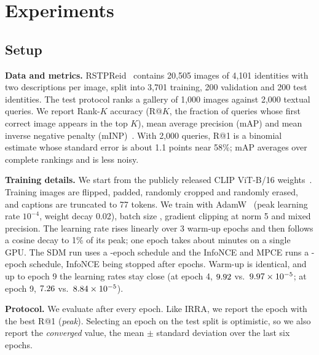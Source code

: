 \section{Experiments \tagO}\label{sec:experiments}

\subsection{Setup}\label{sec:setup}

\textbf{Data and metrics.} RSTPReid~\cite{Zhu_2021} contains 20,505 images of 4,101 identities with two descriptions per image, split into 3,701 training, 200 validation and 200 test identities. The test protocol ranks a gallery of 1,000 images against 2,000 textual queries. We report Rank-$K$ accuracy (R@$K$, the fraction of queries whose first correct image appears in the top $K$), mean average precision (mAP) and mean inverse negative penalty (mINP)~\cite{jiang2023crossmodalimplicitrelationreasoning}. With 2,000 queries, R@1 is a binomial estimate whose standard error is about 1.1 points near 58\%; mAP averages over complete rankings and is less noisy.

\textbf{Training details.} We start from the publicly released CLIP ViT-B/16 weights~\cite{radford2021learningtransferablevisualmodels}. Training images are flipped, padded, randomly cropped and randomly erased, and captions are truncated to 77 tokens. We train with AdamW~\cite{loshchilov2019decoupledweightdecayregularization} (peak learning rate $10^{-4}$, weight decay 0.02), batch size \batchSize, gradient clipping at norm 5 and mixed precision. The learning rate rises linearly over 3 warm-up epochs and then follows a cosine decay to 1\% of its peak; one epoch takes about \sdmMinPerEp{} minutes on a single GPU. The SDM run uses a \sdmRounds-epoch schedule and the InfoNCE and MPCE runs a \nceRounds-epoch schedule, InfoNCE being stopped after \nceEpochs{} epochs. Warm-up is identical, and up to epoch 9 the learning rates stay close (at epoch 4, $9.92$ vs.\ $9.97\times10^{-5}$; at epoch 9, $7.26$ vs.\ $8.84\times10^{-5}$).

\textbf{Protocol.} We evaluate after every epoch. Like IRRA, we report the epoch with the best R@1 (\emph{peak}). Selecting an epoch on the test split is optimistic, so we also report the \emph{converged} value, the mean $\pm$ standard deviation over the last six epochs.

